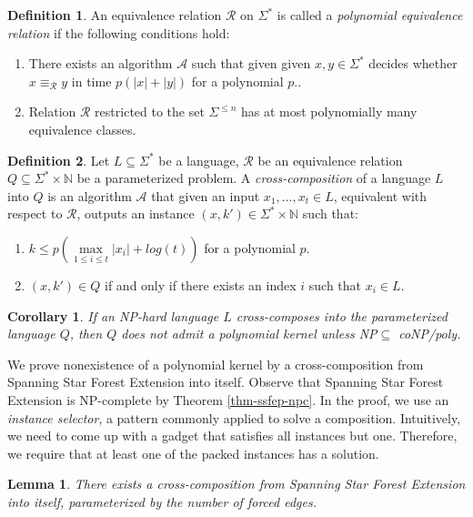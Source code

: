 \documentclass[en]{pracamgr}
\newtheorem{lemma}{Lemma}
\newtheorem{corollary}{Corollary}
\theoremstyle{definition}
\newtheorem{definition}{Definition}
\newcommand{\ssfep}{{\sc Spanning Star Forest Extension}}
\begin{document}
\begin{definition}\label{polynomial equivalence relation}
	An equivalence relation $\mathcal{R}$ on $\Sigma^*$ is called a \textit{polynomial equivalence relation} if the following conditions hold:
	\begin{enumerate}
		\item There exists an algorithm $\mathcal{A}$ such that given given $x,y \in \Sigma^*$ decides whether $x \equiv_{\mathcal{R}} y$ in time $p(|x|+|y|)$ for a polynomial $p$..
		\item Relation $\mathcal{R}$ restricted to the set $\Sigma^{\leq n}$ has at most polynomially many equivalence classes.
	\end{enumerate}
\end{definition}

\begin{definition}\label{cross-composition}
	Let $L \subseteq \Sigma^*$ be a language, $\mathcal{R}$ be an equivalence relation $Q \subseteq \Sigma^* \times \mathbb{N}$ be a parameterized problem. A \textit{cross-composition} of a language $L$ into $Q$ is an algorithm $\mathcal{A}$ that given an input $x_1,...,x_t \in L$, equivalent with respect to $\mathcal{R}$, outputs an instance $(x,k') \in \Sigma^* \times \mathbb{N}$ such that:
	\begin{enumerate}
		\item $k \leq p(\max\limits_{1 \leq i \leq t} |x_i| + log(t))$ for a polynomial $p$.
		\item $(x,k') \in Q$ if and only if there exists an index $i$ such that $x_i \in L$.
	\end{enumerate}
\end{definition}

\begin{corollary}\label{nokernel}
	If an NP-hard language $L$ cross-composes into the parameterized language $Q$, then $Q$ does not admit a polynomial kernel unless \textit{NP$\subseteq$ coNP/poly}.
\end{corollary}

We prove nonexistence of a polynomial kernel by a cross-composition from \ssfep{} into itself. Observe that \ssfep{} is NP-complete by Theorem \ref{thm-ssfep-npc}. In the proof, we use an \emph{instance selector}, a pattern commonly applied to solve a composition. Intuitively, we need to come up with a gadget that satisfies all instances but one. Therefore, we require that at least one of the packed instances has a solution.

\begin{lemma}\label{cross-ssfe}
	There exists a cross-composition from \ssfep{} into itself, parameterized by the number of forced edges.
\end{lemma}
\end{document}
